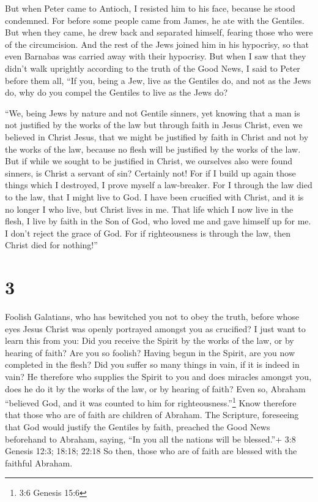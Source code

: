 But when Peter came to Antioch, I resisted him to his
face, because he stood condemned.  For before some people
came from James, he ate with the Gentiles. But when they came, he drew
back and separated himself, fearing those who were of the circumcision.
 And the rest of the Jews joined him in his hypocrisy, so
that even Barnabas was carried away with their hypocrisy. 
But when I saw that they didn't walk uprightly according to the truth of
the Good News, I said to Peter before them all, ``If you, being a Jew,
live as the Gentiles do, and not as the Jews do, why do you compel the
Gentiles to live as the Jews do?

 ``We, being Jews by nature and not Gentile sinners,
 yet knowing that a man is not justified by the works of
the law but through faith in Jesus Christ, even we believed in Christ
Jesus, that we might be justified by faith in Christ and not by the
works of the law, because no flesh will be justified by the works of the
law.  But if while we sought to be justified in Christ, we
ourselves also were found sinners, is Christ a servant of sin? Certainly
not!  For if I build up again those things which I
destroyed, I prove myself a law-breaker.  For I through the
law died to the law, that I might live to God.  I have been
crucified with Christ, and it is no longer I who live, but Christ lives
in me. That life which I now live in the flesh, I live by faith in the
Son of God, who loved me and gave himself up for me.  I
don't reject the grace of God. For if righteousness is through the law,
then Christ died for nothing!''

\hypertarget{section-2}{%
\section{3}\label{section-2}}

 Foolish Galatians, who has bewitched you not to obey the
truth, before whose eyes Jesus Christ was openly portrayed amongst you
as crucified?  I just want to learn this from you: Did you
receive the Spirit by the works of the law, or by hearing of faith?
 Are you so foolish? Having begun in the Spirit, are you now
completed in the flesh?  Did you suffer so many things in
vain, if it is indeed in vain?  He therefore who supplies
the Spirit to you and does miracles amongst you, does he do it by the
works of the law, or by hearing of faith?  Even so, Abraham
``believed God, and it was counted to him for
righteousness.''\footnote{3:6 Genesis 15:6}  Know therefore
that those who are of faith are children of Abraham.  The
Scripture, foreseeing that God would justify the Gentiles by faith,
preached the Good News beforehand to Abraham, saying, ``In you all the
nations will be blessed.''+ 3:8 Genesis 12:3; 18:18; 22:18 
So then, those who are of faith are blessed with the faithful Abraham.


